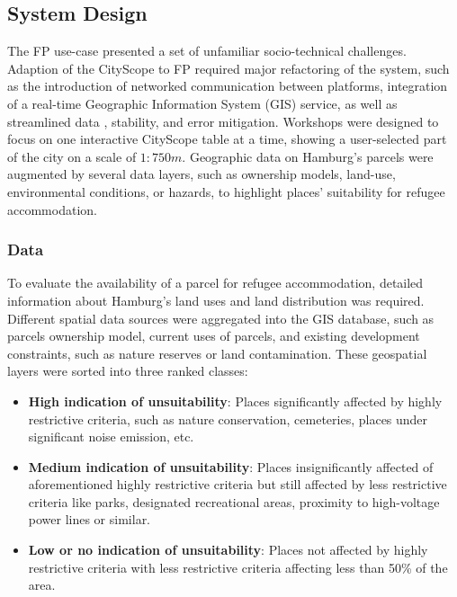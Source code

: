 {    \subsection{System Design}
    {
        The FP use-case presented a set of unfamiliar socio-technical challenges. Adaption of the CityScope to FP required major refactoring of the system, such as the introduction of networked communication between platforms, integration of a real-time Geographic Information System (GIS) service, as well as streamlined data , stability, and error mitigation. Workshops were designed to focus on one interactive CityScope table at a time, showing a user-selected part of the city on a scale of $1:750m$. Geographic data on Hamburg's parcels were augmented by several data layers, such as ownership models, land-use, environmental conditions, or hazards, to highlight places' suitability for refugee accommodation.

        \subsubsection{Data}
        {
            To evaluate the availability of a parcel for refugee accommodation, detailed information about Hamburg's land uses and land distribution was required. Different spatial data sources were aggregated into the GIS database, such as parcels ownership model, current uses of parcels, and existing development constraints, such as nature reserves or land contamination. These geospatial layers were sorted into three ranked classes:

            \begin{itemize}
                \item{
                            \textbf{High indication of unsuitability}: Places significantly affected by highly restrictive criteria, such as nature conservation, cemeteries, places under significant noise emission, etc.
                      }
                \item{
                            \textbf{Medium indication of unsuitability}: Places insignificantly affected of aforementioned highly restrictive criteria but still affected by less restrictive criteria like parks, designated recreational areas, proximity to high-voltage power lines or similar.
                      }
                \item{
                            \textbf{Low or no indication of unsuitability}: Places not affected by highly restrictive criteria with less restrictive criteria affecting less than 50\% of the area.
                      }


\end{itemize}}}}
